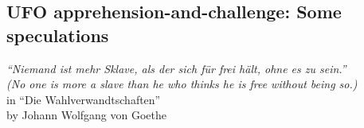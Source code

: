 %
%
%

\begin{partbacktext}
\part{UFO apprehension-and-challenge: Some speculations}
\noindent

\begin{flushright}
{\em ``Niemand ist mehr Sklave,  als der sich f\"ur frei h\"alt,  ohne es zu sein.''} \\
{\em (No one is more a slave  than he who thinks he is free  without being so.)}   \\
in ``Die Wahlverwandtschaften'' \\by Johann Wolfgang von Goethe~\cite{Goethe-WV}
\end{flushright}


\end{partbacktext}
